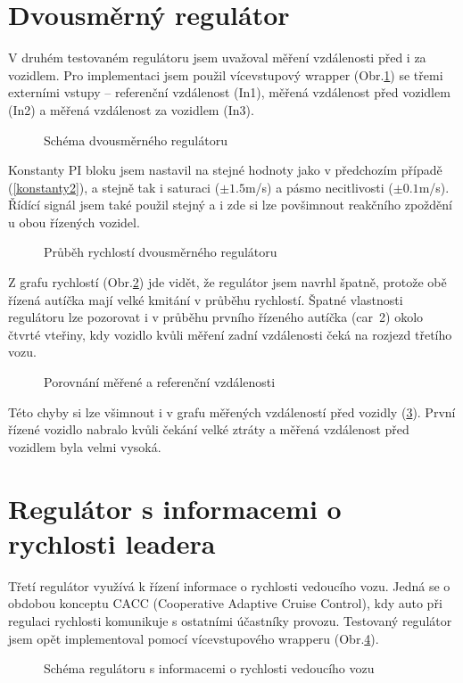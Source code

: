 \documentclass[thesis=M,czech,hidelinks]{FITthesis}[2012/06/26]
\begin{document}
\section{Dvousměrný regulátor}
V druhém testovaném regulátoru jsem uvažoval měření vzdálenosti před i za vozidlem. Pro implementaci jsem použil vícevstupový wrapper (Obr.\ref{fig:bidir}) se třemi externími vstupy – referenční vzdálenost (In1), měřená vzdálenost před vozidlem (In2) a měřená vzdálenost za vozidlem (In3).
\begin{figure}[h]
        \centering
        \caption{Schéma dvousměrného regulátoru}
        \label{fig:bidir}
\end{figure}

Konstanty PI bloku jsem nastavil na stejné hodnoty jako v předchozím případě (\ref{konstanty2}), a stejně tak i saturaci ($\pm1.5$m/s) a pásmo necitlivosti ($\pm0.1$m/s). Řídící signál jsem také použil stejný a i zde si lze povšimnout reakčního zpoždění u obou řízených vozidel.
\begin{figure}[h]
        \centering
        \caption{Průběh rychlostí dvousměrného regulátoru}
        \label{fig:bidirV}
\end{figure}

Z grafu rychlostí (Obr.\ref{fig:bidirV}) jde vidět, že regulátor jsem navrhl špatně, protože obě řízená autíčka mají velké kmitání v průběhu rychlostí. Špatné vlastnosti regulátoru lze pozorovat i v průběhu prvního řízeného autíčka (car~2) okolo čtvrté vteřiny, kdy vozidlo kvůli měření zadní vzdálenosti čeká na rozjezd třetího vozu.
\begin{figure}[h]
        \centering
        \caption{Porovnání měřené a referenční vzdálenosti}
        \label{fig:bidirD}
\end{figure}

Této chyby si lze všimnout i v grafu měřených vzdáleností před vozidly (\ref{fig:bidirD}). První řízené vozidlo nabralo kvůli čekání velké ztráty a měřená vzdálenost před vozidlem byla velmi vysoká.
\section{Regulátor s informacemi o rychlosti leadera}
Třetí regulátor využívá k řízení informace o rychlosti vedoucího vozu. Jedná se o obdobou konceptu CACC (Cooperative Adaptive Cruise Control), kdy auto při regulaci rychlosti komunikuje s ostatními účastníky provozu. Testovaný regulátor jsem opět implementoval pomocí vícevstupového wrapperu (Obr.\ref{fig:lead}). 
\begin{figure}[h]
        \centering
        \caption{Schéma regulátoru s informacemi o rychlosti vedoucího vozu}
        \label{fig:lead}
\end{figure}
\end{document}
